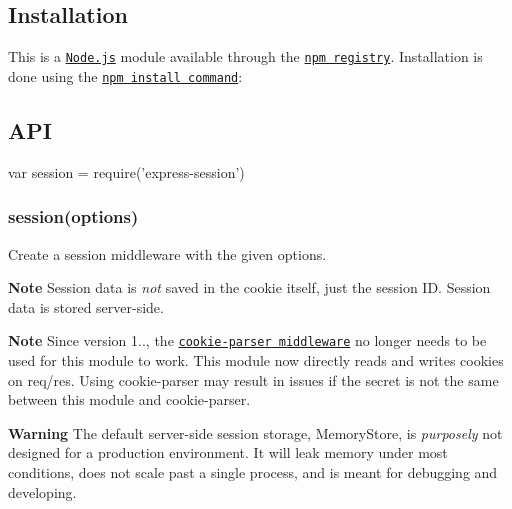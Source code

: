 \href{https://npmjs.org/package/express-session}{\tt } \href{https://npmjs.org/package/express-session}{\tt } \href{https://travis-ci.org/expressjs/session}{\tt } \href{https://coveralls.io/r/expressjs/session?branch=master}{\tt } \href{https://gratipay.com/dougwilson/}{\tt }

\subsection*{Installation}

This is a \href{https://nodejs.org/en/}{\tt Node.\+js} module available through the \href{https://www.npmjs.com/}{\tt npm registry}. Installation is done using the \href{https://docs.npmjs.com/getting-started/installing-npm-packages-locally}{\tt {\ttfamily npm install} command}\+:




\subsection*{A\+PI}


\begin{DoxyCode}
var session = require('express-session')
\end{DoxyCode}


\subsubsection*{session(options)}

Create a session middleware with the given {\ttfamily options}.

{\bfseries Note} Session data is {\itshape not} saved in the cookie itself, just the session ID. Session data is stored server-\/side.

{\bfseries Note} Since version 1.., the \href{https://www.npmjs.com/package/cookie-parser}{\tt {\ttfamily cookie-\/parser} middleware} no longer needs to be used for this module to work. This module now directly reads and writes cookies on {\ttfamily req}/{\ttfamily res}. Using {\ttfamily cookie-\/parser} may result in issues if the {\ttfamily secret} is not the same between this module and {\ttfamily cookie-\/parser}.

{\bfseries Warning} The default server-\/side session storage, {\ttfamily Memory\+Store}, is {\itshape purposely} not designed for a production environment. It will leak memory under most conditions, does not scale past a single process, and is meant for debugging and developing.


